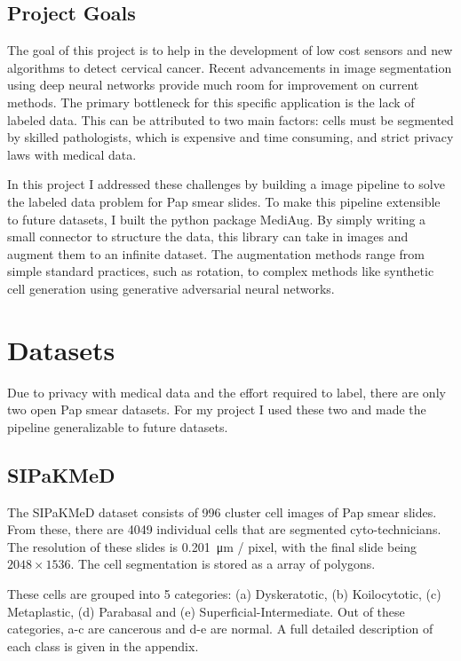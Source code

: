 \documentclass[ms,electronic,oneside,twosidetoc,letterpaper,chaptercenter,parttop]{byumsphd}
\begin{document}
\section{Project Goals}

The goal of this project is to help in the development of low cost sensors and new algorithms to detect cervical cancer.
Recent advancements in image segmentation using deep neural networks provide much room for improvement on current methods.
The primary bottleneck for this specific application is the lack of labeled data. This can be attributed to two main factors:
cells must be segmented by skilled pathologists, which is expensive and time consuming, and strict privacy laws with medical data.

In this project I addressed these challenges by building a image pipeline to solve the labeled data problem for Pap smear slides. To make this 
pipeline extensible to future datasets, I built the python package MediAug. By simply writing a small connector to structure the data, this library
can take in images and augment them to an infinite dataset. The augmentation methods range from simple standard practices, such as rotation, to complex methods
like synthetic cell generation using generative adversarial neural networks.

\chapter{Datasets}

Due to privacy with medical data and the effort required to label, there are only two open Pap smear datasets. For my project I used these two and made the pipeline generalizable
to future datasets.

\section{SIPaKMeD}

The SIPaKMeD dataset consists of 996 cluster cell images of Pap smear slides. From these, there are
4049 individual cells that are segmented cyto-technicians. The resolution of these slides is \SI{0.201}{\micro\metre} / pixel,
with the final slide being $2048\times 1536$. The cell segmentation is stored as a array of polygons.

These cells are grouped into 5 categories: 
(a) Dyskeratotic, (b) Koilocytotic, (c) Metaplastic, (d) Parabasal and (e) Superficial-Intermediate. Out of these categories, a-c are
cancerous and d-e are normal. A full detailed description of each class is given in the appendix.
\end{document}
